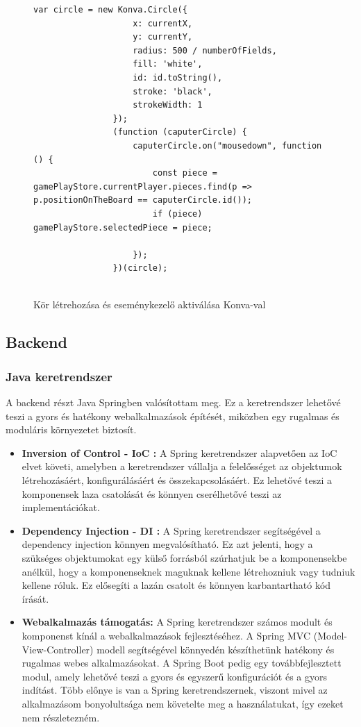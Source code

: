 \documentclass[a4paper,twoside]{article}
\begin{document}
\begin{figure}
	\caption{Kör létrehozása és eseménykezelő aktiválása Konva-val}
	
		\begin{minipage}{\textwidth}
			\begin{lstlisting}[style=javascriptStyle]
				var circle = new Konva.Circle({
					x: currentX,
					y: currentY,
					radius: 500 / numberOfFields,
					fill: 'white',
					id: id.toString(),
					stroke: 'black',
					strokeWidth: 1
				});
				(function (caputerCircle) {
					caputerCircle.on("mousedown", function () {
						const piece = gamePlayStore.currentPlayer.pieces.find(p => p.positionOnTheBoard == caputerCircle.id());
						if (piece) gamePlayStore.selectedPiece = piece;
						
					});
				})(circle);
				
			\end{lstlisting}
		\end{minipage}
	
	\label{konva}
\end{figure} 

\subsection{Backend}

\subsubsection{Java keretrendszer}
A backend részt Java Springben valósítottam meg. Ez a keretrendszer lehetővé teszi a gyors és hatékony
webalkalmazások építését, miközben egy rugalmas és moduláris környezetet biztosít.
\begin{itemize}
	\item  \textbf{Inversion of Control - IoC \cite{ioc}:} A Spring keretrendszer alapvetően az IoC elvet követi,
	amelyben a keretrendszer vállalja a felelősséget az objektumok létrehozásáért,
	konfigurálásáért és összekapcsolásáért. Ez lehetővé teszi a komponensek laza
	csatolását és könnyen cserélhetővé teszi az implementációkat.
	\item \textbf{Dependency Injection - DI \cite{dependencyInj}:} A Spring keretrendszer segítségével a dependency
	injection könnyen megvalósítható. Ez azt jelenti, hogy a szükséges objektumokat egy
	külső forrásból szúrhatjuk be a komponensekbe anélkül, hogy a komponenseknek
	maguknak kellene létrehozniuk vagy tudniuk kellene róluk. Ez elősegíti a lazán
	csatolt és könnyen karbantartható kód írását.
	\item \textbf{Webalkalmazás támogatás:} A Spring keretrendszer számos modult és komponenst
	kínál a webalkalmazások fejlesztéséhez. A Spring MVC (Model-View-Controller)
	modell segítségével könnyedén készíthetünk hatékony és rugalmas webes
	alkalmazásokat. A Spring Boot pedig egy továbbfejlesztett modul, amely lehetővé
	teszi a gyors és egyszerű konfigurációt és a gyors indítást. Több előnye is van a Spring
	keretrendszernek, viszont mivel az alkalmazásom bonyolultsága nem követelte meg a
	használatukat, így ezeket nem részletezném.
\end{itemize}
\end{document}
